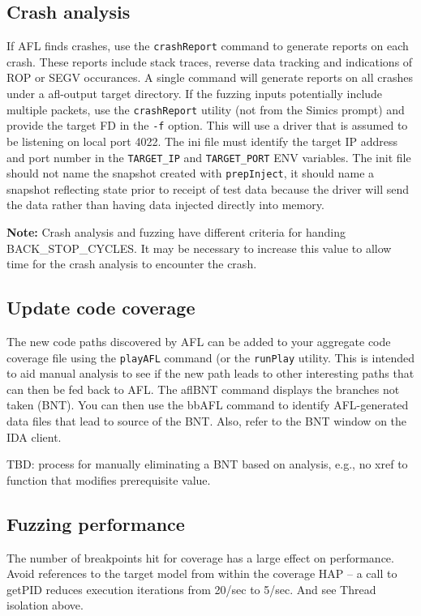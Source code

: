 \documentclass[titlepage]{article}
\begin{document}
\subsection{Crash analysis}
If AFL finds crashes, use the {\tt crashReport} command to generate reports on each crash.  These reports include stack traces, reverse
data tracking and indications of ROP or SEGV occurances.  A single command will generate reports on all crashes under a afl-output target
directory.  If the fuzzing inputs potentially include multiple packets, use the {\tt crashReport} utility (not from the Simics prompt) and provide
the target FD in the {\tt -f} option.  This will use a driver that is assumed to be listening on local port 4022.  The ini file must identify the target IP
address and port number in the {\tt TARGET\_IP} and {\tt TARGET\_PORT} ENV variables.  The init file should not name the snapshot created with {\tt prepInject},
it should name a snapshot reflecting state prior to receipt of test data because the driver will send the data rather than having data injected directly into 
memory.

\textbf{Note:} Crash analysis and fuzzing have different criteria for handing BACK\_STOP\_CYCLES.  It may be necessary to increase this 
value to allow time for the crash analysis to encounter the crash.


\subsection{Update code coverage}
The new code paths discovered by AFL can be added to your aggregate code coverage file using the {\tt playAFL} command (or the {\tt runPlay} utility.  This is intended
to aid manual analysis to see if the new path leads to other interesting paths that can then be fed back to AFL.  
The  aflBNT command displays the branches not taken (BNT).  You can then use the bbAFL command to identify AFL-generated data files
that lead to source of the BNT.  Also, refer to the BNT window on
the IDA client.

TBD: process for manually eliminating a BNT based on analysis, e.g., no xref to function that modifies prerequisite value.

\subsection{Fuzzing performance}
The number of breakpoints hit for coverage has a large effect on performance.
Avoid references to the target model from within the coverage HAP -- a call to getPID reduces execution iterations from 20/sec to 5/sec.
And see Thread isolation above.
\end{document}
